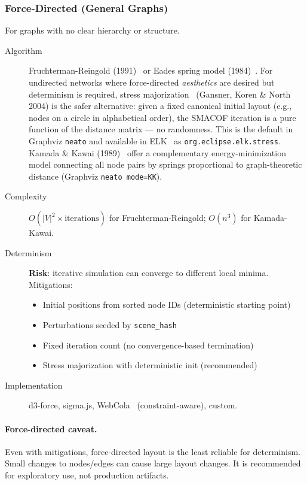 \subsubsection{Force-Directed (General Graphs)}

For graphs with no clear hierarchy or structure.

\begin{description}
  \item[Algorithm] Fruchterman-Reingold (1991)~\cite{fruchterman1991} or
    Eades spring model (1984)~\cite{eades1984}.
    For undirected networks where force-directed \emph{aesthetics} are desired
    but determinism is required, stress
    majorization~\cite{gansnerStressMaj2004} (Gansner, Koren \& North 2004)
    is the safer alternative: given a fixed canonical initial layout (e.g.,
    nodes on a circle in alphabetical order), the SMACOF iteration is a pure
    function of the distance matrix --- no randomness.
    This is the default in Graphviz \texttt{neato} and available in
    ELK~\cite{elk} as \texttt{org.eclipse.elk.stress}.
    Kamada \& Kawai (1989)~\cite{kamadaKawai1989} offer a complementary
    energy-minimization model connecting all node pairs by springs proportional
    to graph-theoretic distance (Graphviz \texttt{neato mode=KK}).
  \item[Complexity] $O(|V|^2 \times \text{iterations})$ for
    Fruchterman-Reingold; $O(n^3)$ for Kamada-Kawai.
  \item[Determinism] \textbf{Risk}: iterative simulation can converge to
    different local minima.  Mitigations:
  \begin{itemize}
    \item Initial positions from sorted node IDs (deterministic starting point)
    \item Perturbations seeded by \texttt{scene\_hash}
    \item Fixed iteration count (no convergence-based termination)
    \item Stress majorization with deterministic init (recommended)
  \end{itemize}
  \item[Implementation] d3-force, sigma.js, WebCola~\cite{webCola} (constraint-aware), custom.
\end{description}

\paragraph{Force-directed caveat.}
Even with mitigations, force-directed layout is the least reliable for determinism. Small changes to nodes/edges can cause large layout changes. It is recommended for exploratory use, not production artifacts.

